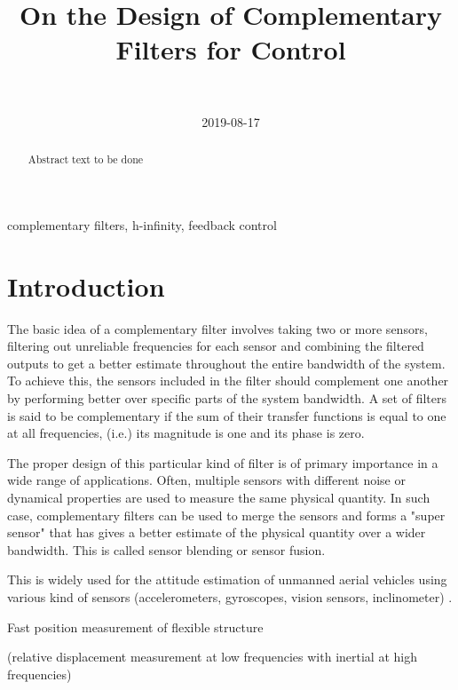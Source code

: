 \documentclass[9pt, technote, a4paper]{ieeeconf}
\author{\IEEEauthorblockN{Dehaeze Thomas\IEEEauthorrefmark{*}, Vermat Mohit and Collette Christophe} \\ \IEEEauthorblockA{Precision Mechatronics Laboratory, ULB\\ Brussels, Belgium\\ Email: \IEEEauthorrefmark{*}dehaeze.thomas@gmail.com}}
\date{2019-08-17}
\title{On the Design of Complementary Filters for Control}
\begin{document}
\maketitle


\begin{abstract}
Abstract text to be done
\end{abstract}

\begin{IEEEkeywords}
complementary filters, h-infinity, feedback control
\end{IEEEkeywords}

\section{Introduction}
\label{sec:orgb94b9f8}
  \label{sec:introduction}
The basic idea of a complementary filter involves taking two or more sensors, filtering out unreliable frequencies for each sensor and combining the filtered outputs to get a better estimate throughout the entire bandwidth of the system.
To achieve this, the sensors included in the filter should complement one another by performing better over specific parts of the system bandwidth.
A set of filters is said to be complementary if the sum of their transfer functions is equal to one at all frequencies, (i.e.) its magnitude is one and its phase is zero.

The proper design of this particular kind of filter is of primary importance in a wide range of applications.
Often, multiple sensors with different noise or dynamical properties are used to measure the same physical quantity.
In such case, complementary filters can be used to merge the sensors and forms a "super sensor" that has gives a better estimate of the physical quantity over a wider bandwidth.
This is called sensor blending or sensor fusion.

This is widely used for the attitude estimation of unmanned aerial vehicles using various kind of sensors (accelerometers, gyroscopes, vision sensors, inclinometer) \cite{zimmermann92_high_bandw_orien_measur_contr,corke04_inert_visual_sensin_system_small_auton_helic,min15_compl_filter_desig_angle_estim}.

\cite{shaw90_bandw_enhan_posit_measur_using_measur_accel} Fast position measurement of flexible structure

\cite{matichard15_seism_isolat_advan_ligo} (relative displacement measurement at low frequencies with inertial at high frequencies)
\end{document}

